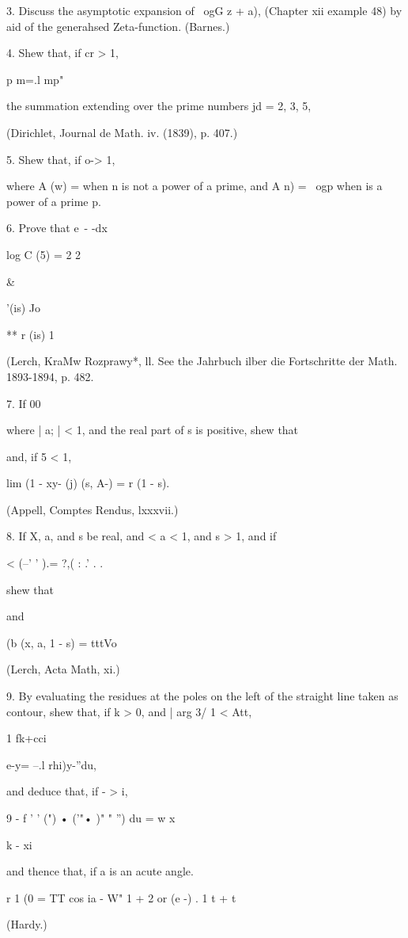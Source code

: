{{3. Discuss the asymptotic expansion of \ ogG z + a), (Chapter xii
example 48) by aid of the generahsed Zeta-function. (Barnes.)

4. Shew that, if cr > 1,

p m=.l mp"

the summation extending over the prime numbers jd = 2, 3, 5,

(Dirichlet, Journal de Math. iv. (1839), p. 407.)

5. Shew that, if o-> 1,

where A (w) = when n is not a power of a prime, and A n) = \ ogp when
is a power of a prime p.

6. Prove that e~- -dx

log C (5) = 2 2

 \&

'(is) Jo

** r (is) 1

(Lerch, KraMw Rozprawy*, ll. See the Jahrbuch ilber die Fortschritte
der Math. 1893-1894, p. 482.

%
%

7. If 00

where | a; | < 1, and the real part of s is positive, shew that

and, if 5 < 1,

lim (1 - xy- (j) (s, A-) = r (1 - s).

(Appell, Comptes Rendus, lxxxvii.)

8. If X, a, and s be real, and < a < 1, and s > 1, and if

< (--' ' ).= ?,( : .' . .

shew that

and

(b (x, a, 1 - s) = tttVo

(Lerch, Acta Math, xi.)

9. By evaluating the residues at the poles on the left of the straight
line taken as contour, shew that, if k > 0, and | arg 3/ 1 < Att,

1 fk+cci

e-y= --.l rhi)y-''du,

and deduce that, if - > i,

9 - f ' ' (") • ('"• )" " '') du = w x\

k - xi

and thence that, if a is an acute angle.

r 1 (0 = TT cos ia - W" 1 + 2 or (e -) . 1 t + t

(Hardy.)

}}
